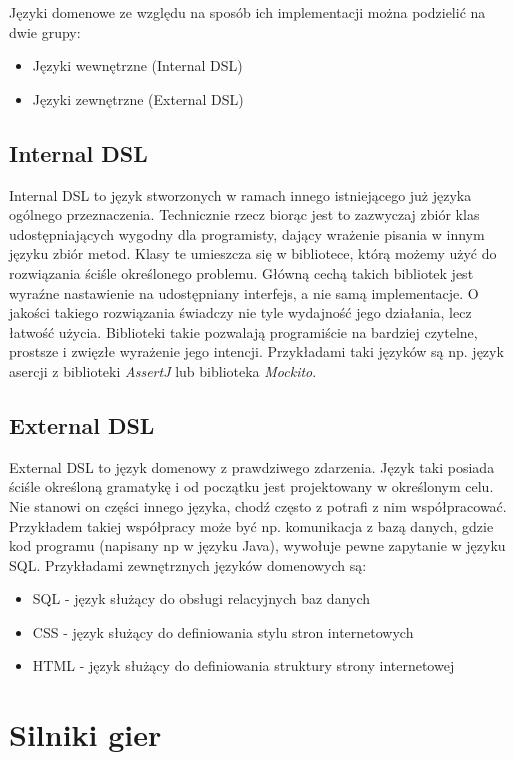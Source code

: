 \documentclass[openright]{xmgr}
\begin{document}
Języki domenowe ze względu na sposób ich implementacji można podzielić na dwie grupy:
\begin{itemize}
\item Języki wewnętrzne (Internal DSL)
\item Języki zewnętrzne (External DSL)
\end{itemize}

\subsection{Internal DSL}

Internal DSL to język stworzonych w ramach innego istniejącego już języka ogólnego przeznaczenia. Technicznie rzecz biorąc jest to zazwyczaj zbiór klas udostępniających wygodny dla programisty, dający wrażenie pisania w innym języku zbiór metod. Klasy te umieszcza się w bibliotece, którą możemy użyć do rozwiązania ściśle określonego problemu. Główną cechą takich bibliotek jest wyraźne nastawienie na udostępniany interfejs, a nie samą implementacje. O jakości takiego rozwiązania świadczy nie tyle wydajność jego działania, lecz łatwość użycia. Biblioteki takie pozwalają programiście na bardziej czytelne, prostsze i zwięzłe wyrażenie jego intencji. Przykładami taki języków są np. język asercji z biblioteki \textit{AssertJ} lub  biblioteka \textit{Mockito}. 

\subsection{External DSL}

External DSL to język domenowy z prawdziwego zdarzenia. Język taki posiada ściśle określoną gramatykę i od początku jest projektowany w określonym celu. Nie stanowi on części innego języka, chodź często z potrafi z nim współpracować. Przykładem takiej współpracy może być np. komunikacja z bazą danych, gdzie kod programu (napisany np w języku Java), wywołuje pewne zapytanie w języku SQL. Przykładami zewnętrznych języków domenowych są:
\begin{itemize}
	\item SQL - język służący do obsługi relacyjnych baz danych
	\item CSS - język służący do definiowania stylu stron internetowych 
	\item HTML - język służący do definiowania struktury strony internetowej
\end{itemize}

\section{Silniki gier}
\end{document}
